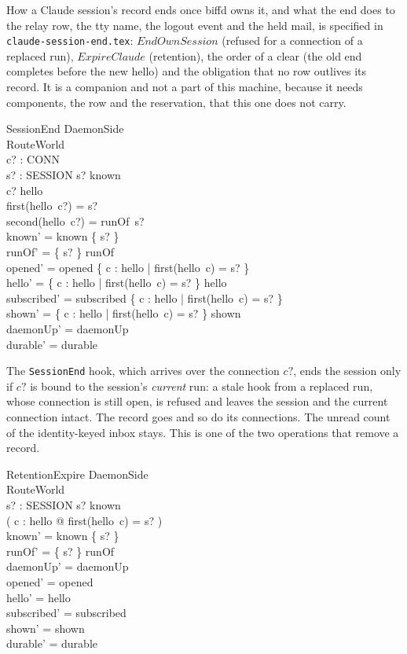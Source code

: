 \documentclass[a4paper,10pt,fleqn]{article}
\begin{document}
How a Claude session's record ends once biffd owns it, and what the end does to
the relay row, the tty name, the logout event and the held mail, is specified in
\texttt{claude-session-end.tex}: $EndOwnSession$ (refused for a connection of a
replaced run), $ExpireClaude$ (retention), the order of a clear (the old end
completes before the new hello) and the obligation that no row outlives its
record.  It is a companion and not a part of this machine, because it needs
components, the row and the reservation, that this one does not carry.

\begin{schema}{SessionEnd}
  \Delta DaemonSide \\
  \Xi RouteWorld \\
  c? : CONN \\
  s? : SESSION
  \where
  s? \in known \\
  c? \in \dom hello \\
  first(hello~c?) = s? \\
  second(hello~c?) = runOf~s? \\
  known' = known \setminus \{ s? \} \\
  runOf' = \{ s? \} \ndres runOf \\
  opened' = opened \setminus
    \{ c : \dom hello | first(hello~c) = s? \} \\
  hello' = \{ c : \dom hello | first(hello~c) = s? \} \ndres hello \\
  subscribed' = subscribed \setminus
    \{ c : \dom hello | first(hello~c) = s? \} \\
  shown' = \{ c : \dom hello | first(hello~c) = s? \} \ndres shown \\
  daemonUp' = daemonUp \\
  durable' = durable
\end{schema}

The \texttt{SessionEnd} hook, which arrives over the connection $c?$,
ends the session only if $c?$ is bound to the session's \emph{current} run:
a stale hook from a replaced run, whose connection is still open, is refused
and leaves the session and the current connection intact.  The record goes
and so do its connections.  The unread count of the identity-keyed inbox stays.  This is
one of the two operations that remove a record.

\begin{schema}{RetentionExpire}
  \Delta DaemonSide \\
  \Xi RouteWorld \\
  s? : SESSION
  \where
  s? \in known \\
  \lnot ( \exists c : \dom hello @ first(hello~c) = s? ) \\
  known' = known \setminus \{ s? \} \\
  runOf' = \{ s? \} \ndres runOf \\
  daemonUp' = daemonUp \\
  opened' = opened \\
  hello' = hello \\
  subscribed' = subscribed \\
  shown' = shown \\
  durable' = durable
\end{schema}
\end{document}
